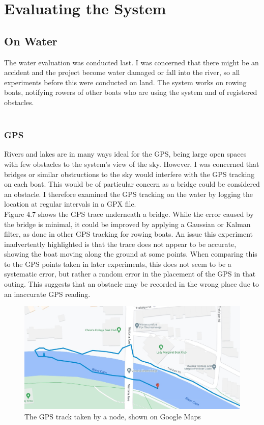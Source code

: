 \documentclass[12pt,a4paper]{report}
\begin{document}
\section{Evaluating the System}
\subsection{On Water} 
The water evaluation was conducted last. I was concerned that there might be an accident and the project become water damaged or fall into the river, so all experiments before this were conducted on land. The system works on rowing boats, notifying rowers of other boats who are using the system and of registered obstacles. \\ \\ 

\subsubsection{GPS}
Rivers and lakes are in many ways ideal for the GPS, being large open spaces with few obstacles to the system's view of the sky. However, I was concerned that bridges or similar obstructions to the sky would interfere with the GPS tracking on each boat. This would be of particular concern as a bridge could be considered an obstacle. I therefore examined the GPS tracking on the water by logging the location at regular intervals in a GPX file. \\
Figure 4.7 shows the GPS trace underneath a bridge. While the error caused by the bridge is minimal, it could be improved by applying a Gaussian or Kalman filter, as done in other GPS tracking for rowing boats. An issue this experiment inadvertently highlighted is that the trace does not appear to be accurate, showing the boat moving along the ground at some points. When comparing this to the GPS points taken in later experiments, this does not seem to be a systematic error, but rather a random error in the placement of the GPS in that outing. This suggests that an obstacle may be recorded in the wrong place due to an inaccurate GPS reading.
\begin{figure}[h]
\begin{center}
\includegraphics[scale=0.3]{bridgeGPS.jpg}
\end{center}
\caption{The GPS track taken by a node, shown on Google Maps \cite{googlemapsgeneral}}
\end{figure}
\end{document}
